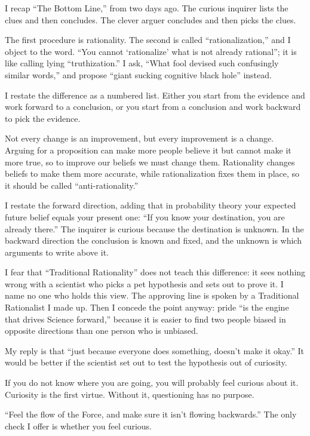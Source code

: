 
I recap ``The Bottom Line,'' from two days ago. The curious inquirer lists the clues and then concludes. The clever arguer concludes and then picks the clues. 

The first procedure is rationality. The second is called ``rationalization,'' and I object to the word. ``You cannot `rationalize' what is not already rational''; it is like calling lying ``truthization.''  I ask, ``What fool devised such confusingly similar words,'' and propose ``giant sucking cognitive black hole'' instead.

I restate the difference as a numbered list. Either you start from the evidence and work forward to a conclusion, or you start from a conclusion and work backward to pick the evidence.

Not every change is an improvement, but every improvement is a change. Arguing for a proposition can make more people believe it but cannot make it more true, so to improve our beliefs we must change them. Rationality changes beliefs to make them more accurate, while rationalization fixes them in place, so it should be called ``anti-rationality.''

I restate the forward direction, adding that in probability theory your expected future belief equals your present one: ``If you know your destination, you are already there.'' The inquirer is curious because the destination is unknown. In the backward direction the conclusion is known and fixed, and the unknown is which arguments to write above it.

I fear that ``Traditional Rationality'' does not teach this difference: it sees nothing wrong with a scientist who picks a pet hypothesis and sets out to prove it. I name no one who holds this view. The approving line is spoken by a Traditional Rationalist I made up.  Then I concede the point anyway: pride ``is the engine that drives Science forward,'' because it is easier to find two people biased in opposite directions than one person who is unbiased.

My reply is that ``just because everyone does something, doesn't make it okay.'' It would be better if the scientist set out to test the hypothesis out of curiosity.

If you do not know where you are going, you will probably feel curious about it. Curiosity is the first virtue. Without it, questioning has no purpose.

``Feel the flow of the Force, and make sure it isn't flowing backwards.'' The only check I offer is whether you feel curious.
